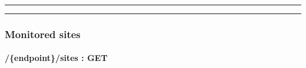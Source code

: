 \documentclass[
]{article}
\begin{document}
\begin{center}\rule{0.5\linewidth}{0.5pt}\end{center}

\begin{center}\rule{0.5\linewidth}{0.5pt}\end{center}

\hypertarget{header-n61173}{%
\subsubsection{Monitored sites}\label{header-n61173}}

\hypertarget{header-n61174}{%
\paragraph{/\{endpoint\}/sites : GET}\label{header-n61174}}
\end{document}
